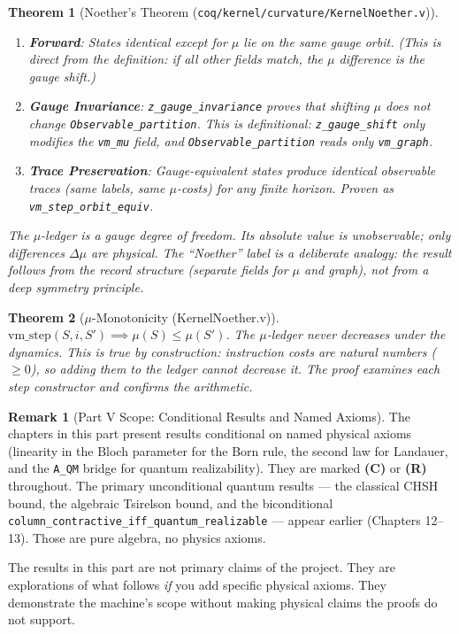 \documentclass[11pt, a4paper]{report}
\theoremstyle{definition}
\newtheorem{remark}{Remark}[chapter]
\theoremstyle{plain}
\newtheorem{theorem}{Theorem}[chapter]
\begin{document}
\begin{theorem}[Noether's Theorem {\normalfont (\texttt{coq/kernel/curvature/KernelNoether.v})}]
\leavevmode
\begin{enumerate}
    \item \textbf{Forward}: States identical except for $\mu$ lie on the same gauge orbit. (This is direct from the definition: if all other fields match, the $\mu$ difference is the gauge shift.)
    \item \textbf{Gauge Invariance}: \texttt{z\_gauge\_invariance} proves that shifting $\mu$ does not change \texttt{Observable\_partition}. This is definitional: \texttt{z\_gauge\_shift} only modifies the \texttt{vm\_mu} field, and \texttt{Observable\_partition} reads only \texttt{vm\_graph}.
    \item \textbf{Trace Preservation}: Gauge-equivalent states produce identical observable traces (same labels, same $\mu$-costs) for any finite horizon. Proven as \texttt{vm\_step\_orbit\_equiv}.
\end{enumerate}
The $\mu$-ledger is a gauge degree of freedom. Its \emph{absolute} value is unobservable; only \emph{differences} $\Delta\mu$ are physical. The ``Noether'' label is a deliberate analogy: the result follows from the record structure (separate fields for $\mu$ and graph), not from a deep symmetry principle.
\end{theorem}

\begin{theorem}[$\mu$-Monotonicity {\normalfont (KernelNoether.v)}]
$\mathrm{vm\_step}(S, i, S') \implies \mu(S) \le \mu(S')$. The $\mu$-ledger never decreases under the dynamics. This is true by construction: instruction costs are natural numbers ($\ge 0$), so adding them to the ledger cannot decrease it. The proof examines each step constructor and confirms the arithmetic.
\end{theorem}


\begin{remark}[Part V Scope: Conditional Results and Named Axioms]
The chapters in this part present results conditional on named physical axioms (linearity in the Bloch parameter for the Born rule, the second law for Landauer, and the \texttt{A\_QM} bridge for quantum realizability). They are marked \textbf{(C)} or \textbf{(R)} throughout. The primary unconditional quantum results — the classical CHSH bound, the algebraic Tsirelson bound, and the biconditional \texttt{column\_contractive\_iff\_quantum\_realizable} — appear earlier (Chapters 12--13). Those are pure algebra, no physics axioms.

The results in this part are not primary claims of the project. They are explorations of what follows \emph{if} you add specific physical axioms. They demonstrate the machine's scope without making physical claims the proofs do not support.
\end{remark}
\end{document}
